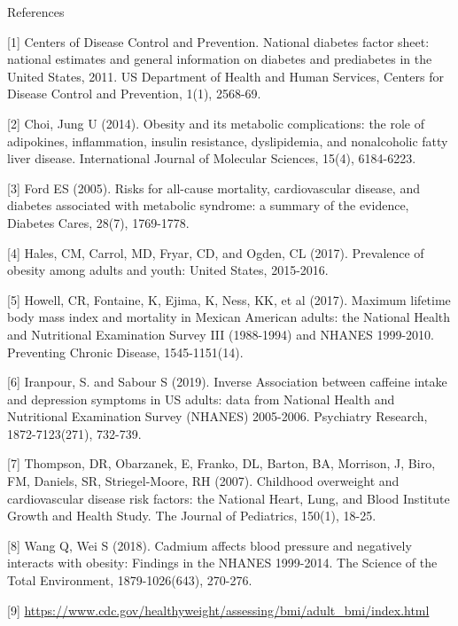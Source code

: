 \documentclass[12pt]{article}
\numberwithin{figure}{section}
\begin{document}
{\sf References}

[1] Centers of Disease Control and Prevention. National diabetes factor sheet: national estimates and general information on diabetes and prediabetes in the United States, 2011. US Department of Health and Human Services, Centers for Disease Control and Prevention, 1(1), 2568-69.

[2] Choi, Jung U (2014). Obesity and its metabolic complications: the role of adipokines, inflammation, insulin resistance, dyslipidemia, and nonalcoholic fatty liver disease.  International Journal of Molecular Sciences, 15(4), 6184-6223.

[3] Ford ES (2005). Risks for all-cause mortality, cardiovascular disease, and diabetes associated with metabolic syndrome: a summary of the evidence, Diabetes Cares, 28(7), 1769-1778.

[4] Hales, CM, Carrol, MD, Fryar, CD, and Ogden, CL (2017). Prevalence of obesity among adults and youth: United States, 2015-2016.

[5] Howell, CR, Fontaine, K, Ejima, K, Ness, KK, et al (2017). Maximum lifetime body mass index and mortality in Mexican American adults: the National Health and Nutritional Examination Survey III (1988-1994) and NHANES 1999-2010. Preventing Chronic Disease, 1545-1151(14).

[6] Iranpour, S. and Sabour S (2019). Inverse Association between caffeine intake and depression symptoms in US adults: data from National Health and Nutritional Examination Survey (NHANES) 2005-2006. Psychiatry Research, 1872-7123(271), 732-739.

[7] Thompson, DR, Obarzanek, E, Franko, DL, Barton, BA, Morrison, J, Biro, FM, Daniels, SR, Striegel-Moore, RH (2007).  Childhood overweight and cardiovascular disease risk factors: the National Heart, Lung, and Blood Institute Growth and Health Study. The Journal of Pediatrics, 150(1), 18-25.

[8] Wang Q, Wei S (2018). Cadmium affects blood pressure and negatively interacts with obesity: Findings in the NHANES 1999-2014. The Science of the Total Environment, 1879-1026(643), 270-276.

[9] \url{https://www.cdc.gov/healthyweight/assessing/bmi/adult_bmi/index.html}
\end{document}
